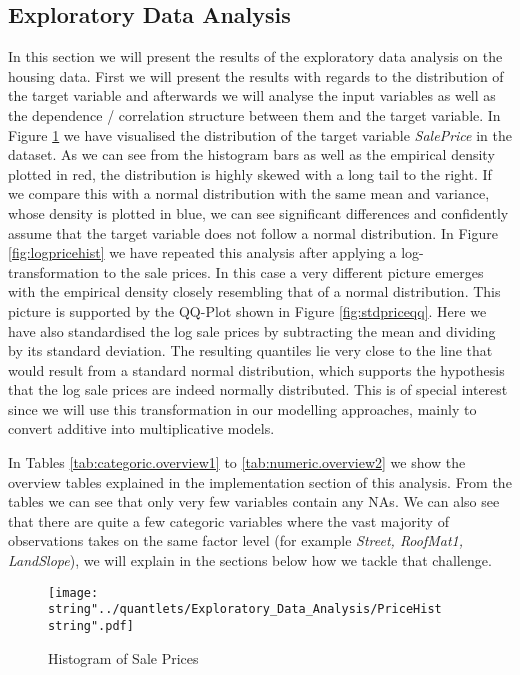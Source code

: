 \subsection{Exploratory Data Analysis}
In this section we will present the results of the exploratory data analysis on the housing data. First we will present the results with regards to the distribution of the target variable and afterwards we will analyse the input variables as well as the dependence / correlation structure between them and the target variable. 
In Figure \ref{fig:pricehist} we have visualised the distribution of the target variable \textit{SalePrice} in the dataset. As we can see from the histogram bars as well as the empirical density plotted in red, the distribution is highly skewed with a long tail to the right. If we compare this with a normal distribution with the same mean and variance, whose density is plotted in blue, we can see significant differences and confidently assume that the target variable does not follow a normal distribution. 
In Figure \ref{fig:logpricehist} we have repeated this analysis after applying a log-transformation to the sale prices. In this case a very different picture emerges with the empirical density closely resembling that of a normal distribution. This picture is supported by the QQ-Plot shown in Figure \ref{fig:stdpriceqq}. Here we have also standardised the log sale prices by subtracting the mean and dividing by its standard deviation. The resulting quantiles lie very close to the line that would result from a standard normal distribution, which supports the hypothesis that the log sale prices are indeed normally distributed. This is of special interest since we will use this transformation in our modelling approaches, mainly to convert additive into multiplicative models. 

In Tables \ref{tab:categoric.overview1} to \ref{tab:numeric.overview2} we show the overview tables explained in the implementation section of this analysis. From the tables we can see that only very few variables contain any NAs. We can also see that there are quite a few categoric variables where the vast majority of observations takes on the same factor level (for example \textit{Street, RoofMat1, LandSlope}), we will explain in the sections below how we tackle that challenge.

\begin{figure}
  \centering
\texttt{[image: \\string"../quantlets/Exploratory\_Data\_Analysis/PriceHist\\string".pdf]}
  \caption{Histogram of Sale Prices}\label{fig:pricehist}
\end{figure}

